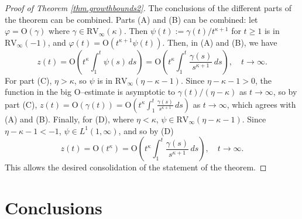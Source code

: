 \documentclass[a4paper,10pt,reqno]{amsart}
\numberwithin{equation}{section}
\theoremstyle{definition}
\theoremstyle{remark}
\DeclareMathOperator{\1}{\mathbbm 1}
\begin{document}
\begin{proof}[Proof of Theorem \ref{thm.growthbounds2}]
The conclusions of the different parts of the theorem can be combined. Parts (A) and (B) can be combined: let $\varphi=\text{O}(\gamma)$ where $\gamma \in \text{RV}_\infty(\kappa)$. Then $\psi(t):=\gamma(t)/t^{\kappa+1}$ for $t\geq 1$ is in $\text{RV}_\infty(-1)$, and $\varphi(t)=\text{O}(t^{\kappa+1}\psi(t))$. Then, in (A) and (B), we have 
\[
z(t)=\text{O}\left(t^\kappa\int_1^t \psi(s)\,ds\right) = \text{O}\left(t^\kappa\int_1^t \frac{\gamma(s)}{s^{\kappa+1}}\,ds\right), \quad t\to\infty.
\] 
For part (C), $\eta>\kappa$, so $\psi$  %
is in $\text{RV}_\infty(\eta-\kappa-1)$. Since $\eta-\kappa-1>0$, the function in the big O--estimate is asymptotic to $\gamma(t)/(\eta-\kappa)$ as $t\to\infty$,  
so by part (C), 
$z(t)=\text{O}(\gamma(t)) = \text{O}\left(t^\kappa\int_1^t \frac{\gamma(s)}{s^{\kappa+1}}\,ds\right)$ as $t\to\infty$,
which agrees with (A) and (B). Finally, for (D), where $\eta<\kappa$, $\psi \in \text{RV}_\infty(\eta-\kappa-1)$. Since $\eta-\kappa-1<-1$, $\psi \in L^1(1,\infty)$, and so by (D)
\[
z(t)=\text{O}(t^\kappa) = \text{O}\left(t^\kappa\int_1^t \frac{\gamma(s)}{s^{\kappa+1}}\,ds\right), \quad t\to\infty.
\] 
This allows the desired consolidation of the statement of the theorem.
\end{proof}

\section{Conclusions}
\end{document}
